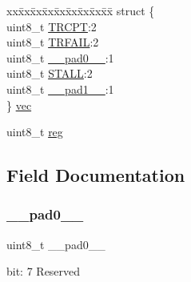 \begin{DoxyCompactItemize}
\begin{tabbing}
\end{tabbing}\item 
\begin{tabbing}
xx\=xx\=xx\=xx\=xx\=xx\=xx\=xx\=xx\=\kill
struct \{\\
\>uint8\_t \mbox{\hyperlink{union_u_s_b___d_e_v_i_c_e___e_p_i_n_t_e_n_c_l_r___type_a483e1559fa2eff15864d13c2f6fd29ae}{TRCPT}}:2\\
\>uint8\_t \mbox{\hyperlink{union_u_s_b___d_e_v_i_c_e___e_p_i_n_t_e_n_c_l_r___type_a07aec3336bfd9ba5afd1e3ee3272fc96}{TRFAIL}}:2\\
\>uint8\_t \mbox{\hyperlink{union_u_s_b___d_e_v_i_c_e___e_p_i_n_t_e_n_c_l_r___type_a8b4eebe79ded0459acec2f4950102ba3}{\_\_pad0\_\_}}:1\\
\>uint8\_t \mbox{\hyperlink{union_u_s_b___d_e_v_i_c_e___e_p_i_n_t_e_n_c_l_r___type_a3115e3c453036179abec9286cab08407}{STALL}}:2\\
\>uint8\_t \mbox{\hyperlink{union_u_s_b___d_e_v_i_c_e___e_p_i_n_t_e_n_c_l_r___type_a77f12d2e278bd5c07712648ac0df5e08}{\_\_pad1\_\_}}:1\\
\} \mbox{\hyperlink{union_u_s_b___d_e_v_i_c_e___e_p_i_n_t_e_n_c_l_r___type_ac0b2a6fcd79f3699ae40fb763101194f}{vec}}\\

\end{tabbing}\item 
uint8\+\_\+t \mbox{\hyperlink{union_u_s_b___d_e_v_i_c_e___e_p_i_n_t_e_n_c_l_r___type_a9428adc9af4653a2050e2536b55dec8d}{reg}}
\end{DoxyCompactItemize}


\subsection{Field Documentation}
\mbox{\label{union_u_s_b___d_e_v_i_c_e___e_p_i_n_t_e_n_c_l_r___type_a8b4eebe79ded0459acec2f4950102ba3}} 
\subsubsection{\texorpdfstring{\_\_pad0\_\_}{\_\_pad0\_\_}}
{\footnotesize\ttfamily uint8\+\_\+t \+\_\+\+\_\+pad0\+\_\+\+\_\+}

bit\+: 7 Reserved


